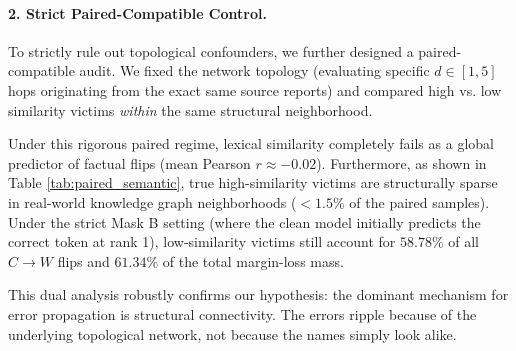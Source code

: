 \begin{table}[h]
\centering
\small
\caption{\textbf{Broad Impact of Semantic Similarity.} In our large-scale (~47k) evaluation, while highly similar entities ($0.7-1.0$) have a high probability of flipping, they represent a very small portion of the dataset. Most errors occur in the low-similarity range.}
\label{tab:semantic_similarity}
\end{table}

\paragraph{2. Strict Paired-Compatible Control.} 
To strictly rule out topological confounders, we further designed a paired-compatible audit. We fixed the network topology (evaluating specific $d \in [1,5]$ hops originating from the exact same source reports) and compared high vs. low similarity victims \textit{within} the same structural neighborhood. 

Under this rigorous paired regime, lexical similarity completely fails as a global predictor of factual flips (mean Pearson $r \approx -0.02$). Furthermore, as shown in Table \ref{tab:paired_semantic}, true high-similarity victims are structurally sparse in real-world knowledge graph neighborhoods ($<1.5\%$ of the paired samples). Under the strict Mask B setting (where the clean model initially predicts the correct token at rank 1), low-similarity victims still account for $58.78\%$ of all $C \rightarrow W$ flips and $61.34\%$ of the total margin-loss mass. 

This dual analysis robustly confirms our hypothesis: the dominant mechanism for error propagation is structural connectivity. The errors ripple because of the underlying topological network, not because the names simply look alike.

